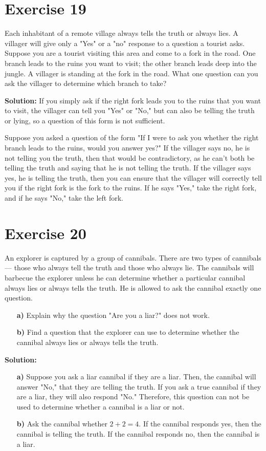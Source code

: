 \documentclass{Axon}
\begin{document}
\section*{Exercise 19}
Each inhabitant of a remote village always tells the truth or always lies. A villager will give only a "Yes" or a "no" response to a question a tourist asks. Suppose you are a tourist visiting this area and come to a fork in the road. One branch leads to the ruins you want to visit; the other branch leads deep into the jungle. A villager is standing at the fork in the road. What one question can you ask the villager to determine which branch to take?

\noindent
\textbf{Solution:}
If you simply ask if the right fork leads you to the ruins that you want to visit, the villager can tell you "Yes" or "No," but can also be telling the truth or lying, so a question of this form is not sufficient.

Suppose you asked a question of the form "If I were to ask you whether the right branch leads to the ruins, would you answer yes?" If the villager says no, he is not telling you the truth, then that would be contradictory, as he can't both be telling the truth and saying that he is not telling the truth. If the villager says yes, he is telling the truth, then you can ensure that the villager will correctly tell you if the right fork is the fork to the ruins. If he says "Yes," take the right fork, and if he says "No," take the left fork.

\section*{Exercise 20}
An explorer is captured by a group of cannibals. There are two types of cannibals --- those who always tell the truth and those who always lie. The cannibals will barbecue the explorer unless he can determine whether a particular cannibal always lies or always tells the truth. He is allowed to ask the cannibal exactly one question.
\begin{enumerate}
    \item[\textbf{a)}] Explain why the question "Are you a liar?" does not work.
    \item[\textbf{b)}] Find a question that the explorer can use to determine whether the cannibal always lies or always tells the truth.
\end{enumerate}

\noindent
\textbf{Solution:}
\begin{enumerate}
    \item[\textbf{a)}] Suppose you ask a liar cannibal if they are a liar. Then, the cannibal will answer "No," that they are telling the truth. If you ask a true cannibal if they are a liar, they will also respond "No." Therefore, this question can not be used to determine whether a cannibal is a liar or not.
    \item[\textbf{b)}] Ask the cannibal whether \(2 + 2 = 4\). If the cannibal responds yes, then the cannibal is telling the truth. If the cannibal responds no, then the cannibal is a liar.
\end{enumerate}
\end{document}
